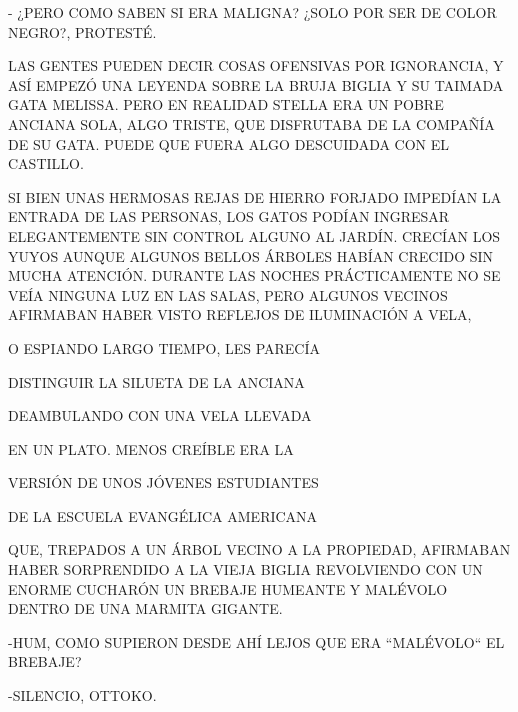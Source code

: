 - ¿PERO COMO SABEN SI ERA MALIGNA? ¿SOLO POR SER DE COLOR NEGRO?, PROTESTÉ.

LAS GENTES PUEDEN DECIR COSAS OFENSIVAS POR IGNORANCIA, Y ASÍ EMPEZÓ UNA LEYENDA SOBRE LA BRUJA BIGLIA Y SU TAIMADA GATA MELISSA. PERO EN REALIDAD STELLA ERA UN POBRE ANCIANA SOLA, ALGO TRISTE, QUE DISFRUTABA DE LA COMPAÑÍA DE SU GATA. PUEDE QUE FUERA ALGO DESCUIDADA CON EL CASTILLO.
\newpage
{}
SI BIEN UNAS HERMOSAS REJAS DE HIERRO FORJADO IMPEDÍAN LA ENTRADA DE LAS PERSONAS, LOS GATOS PODÍAN INGRESAR ELEGANTEMENTE SIN CONTROL ALGUNO AL JARDÍN. CRECÍAN LOS YUYOS AUNQUE ALGUNOS BELLOS ÁRBOLES HABÍAN CRECIDO SIN MUCHA ATENCIÓN.  DURANTE LAS NOCHES PRÁCTICAMENTE NO SE VEÍA NINGUNA LUZ EN LAS SALAS, PERO ALGUNOS VECINOS AFIRMABAN HABER VISTO REFLEJOS DE ILUMINACIÓN   A VELA,

O ESPIANDO LARGO TIEMPO, LES PARECÍA

DISTINGUIR  LA SILUETA DE LA ANCIANA 

DEAMBULANDO CON UNA VELA LLEVADA 

EN UN PLATO. MENOS CREÍBLE ERA LA

VERSIÓN DE UNOS JÓVENES ESTUDIANTES 

DE LA ESCUELA EVANGÉLICA AMERICANA

\newpage
{}
QUE, TREPADOS A UN ÁRBOL VECINO A LA PROPIEDAD, AFIRMABAN HABER SORPRENDIDO A LA VIEJA  BIGLIA REVOLVIENDO CON UN ENORME CUCHARÓN UN BREBAJE HUMEANTE Y MALÉVOLO DENTRO DE UNA MARMITA GIGANTE.

-HUM, COMO SUPIERON DESDE AHÍ LEJOS QUE ERA ``MALÉVOLO`` EL BREBAJE?

-SILENCIO, OTTOKO.

